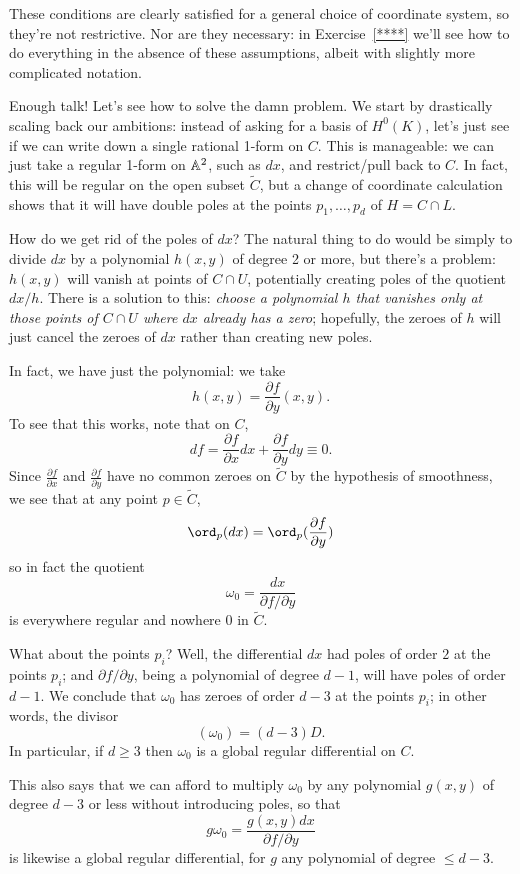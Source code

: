 These conditions are clearly satisfied for a general choice of coordinate system, so they're not restrictive. Nor are they necessary: in Exercise~\ref{****} we'll see how to do everything in the absence of these assumptions, albeit with slightly more complicated notation.
 
Enough talk! Let's see how to solve the damn problem. We start by drastically scaling back our ambitions: instead of asking for a basis of $H^0(K)$, let's just see if we can write down a single rational 1-form on $C$. This is manageable: we can just take a regular 1-form on $\AA^2$, such as $dx$, and restrict/pull back to $C$. In fact, this will be regular on the open subset $\tilde C$, but a change of coordinate calculation shows that it will have double poles at the points $p_1,\dots,p_d$ of $H = C \cap L$.
 
 How do we get rid of the poles of $dx$? The natural thing to do would be simply to divide $dx$ by a polynomial $h(x,y)$ of degree 2 or more, but there's a problem: $h(x,y)$ will vanish at points of $C \cap U$, potentially creating poles of the quotient $dx/h$. There is a solution to this: \emph{choose a polynomial $h$ that vanishes only at those points of $C \cap U$ where $dx$ already has a zero}; hopefully, the zeroes of $h$ will just cancel the zeroes of $dx$ rather than creating new poles.
 
 In fact, we have just the polynomial: we take
 $$
 h(x,y) = \frac{\partial f}{\partial y}(x,y).
 $$
 To see that this works, note that on $C$,
 $$
 df = \frac{\partial f}{\partial x}dx + \frac{\partial f}{\partial y}dy \equiv 0.
 $$
Since $\frac{\partial f}{\partial x}$ and $\frac{\partial f}{\partial y}$ have no common zeroes on $\tilde C$ by the hypothesis of smoothness, we see that at any point $p \in \tilde C$,
$$
\ord_p(dx) = \ord_p(\frac{\partial f}{\partial y})
$$ 
so in fact the quotient 
$$
\omega_0 = \frac{dx}{\partial f/\partial y}
$$
is everywhere regular and nowhere 0 in $\tilde C$.

What about the points $p_i$? Well, the differential $dx$ had poles of order $2$ at the points $p_i$; and $\partial f/\partial y$, being a polynomial of degree $d-1$, will have poles of order $d-1$. We conclude that $\omega_0$ has zeroes of order $d-3$ at the points $p_i$; in other words, the divisor
$$
(\omega_0) = (d-3)D.
$$
In particular, if $d \geq 3$ then $\omega_0$ is a global regular differential on $C$.

This also says that we can afford to multiply $\omega_0$ by any polynomial $g(x,y)$ of degree $d-3$ or less without introducing poles, so that 
$$
g\omega_0 = \frac{g(x,y)dx}{\partial f/\partial y}
$$ 
is likewise a global regular differential, for $g$  any polynomial of degree $\leq d-3$.

